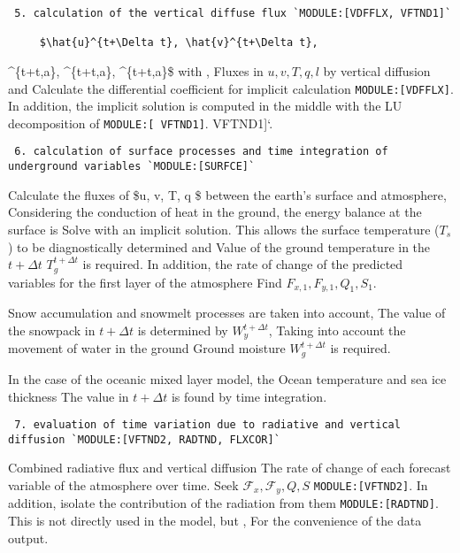 \begin{verbatim}
 5. calculation of the vertical diffuse flux `MODULE:[VDFFLX, VFTND1]`

     $\hat{u}^{t+\Delta t}, \hat{v}^{t+\Delta t},
\end{verbatim}

\^{}\{t+\Delta t,a\}, \^{}\{t+\Delta t,a\},
\^{}\{t+\Delta t,a\}\$ with , Fluxes in \(u, v, T, q, l\) by
vertical diffusion and Calculate the differential coefficient for
implicit calculation \texttt{MODULE:{[}VDFFLX{]}}. In addition, the
implicit solution is computed in the middle with the LU decomposition of
\texttt{MODULE:{[}\ VFTND1{]}}. VFTND1{]}`.

\begin{verbatim}
 6. calculation of surface processes and time integration of underground variables `MODULE:[SURFCE]`
\end{verbatim}

Calculate the fluxes of \$u, v, T, q \$ between the earth's surface and
atmosphere, Considering the conduction of heat in the ground, the energy
balance at the surface is Solve with an implicit solution. This allows
the surface temperature (\(T_s\)) to be diagnostically determined and
Value of the ground temperature in the \(t+\Delta t\)
\(T_g^{t+\Delta t}\) is required. In addition, the rate of change of the
predicted variables for the first layer of the atmosphere Find
\(F_{x,1}, F_{y,1}, Q_1, S_1\).

Snow accumulation and snowmelt processes are taken into account, The
value of the snowpack in \(t+\Delta t\) is determined by
\(W_y^{t+\Delta t}\), Taking into account the movement of water in the
ground Ground moisture \(W_g^{t+\Delta t}\) is required.

In the case of the oceanic mixed layer model, the Ocean temperature and
sea ice thickness The value in \(t+\Delta t\) is found by time
integration.

\begin{verbatim}
 7. evaluation of time variation due to radiative and vertical diffusion `MODULE:[VFTND2, RADTND, FLXCOR]`
\end{verbatim}

Combined radiative flux and vertical diffusion The rate of change of
each forecast variable of the atmosphere over time. Seek
\({\mathcal F}_x, {\mathcal F}_y, Q, S\) \texttt{MODULE:{[}VFTND2{]}}.
In addition, isolate the contribution of the radiation from them
\texttt{MODULE:{[}RADTND{]}}. This is not directly used in the model,
but , For the convenience of the data output.


